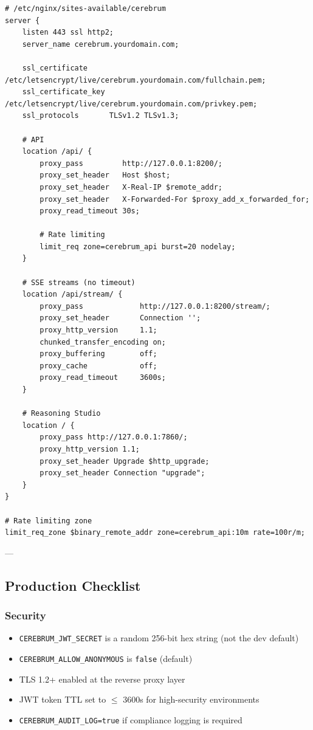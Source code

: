 \documentclass[11pt,article,oneside]{memoir}
\begin{document}
\begin{lstlisting}
# /etc/nginx/sites-available/cerebrum
server {
    listen 443 ssl http2;
    server_name cerebrum.yourdomain.com;

    ssl_certificate     /etc/letsencrypt/live/cerebrum.yourdomain.com/fullchain.pem;
    ssl_certificate_key /etc/letsencrypt/live/cerebrum.yourdomain.com/privkey.pem;
    ssl_protocols       TLSv1.2 TLSv1.3;

    # API
    location /api/ {
        proxy_pass         http://127.0.0.1:8200/;
        proxy_set_header   Host $host;
        proxy_set_header   X-Real-IP $remote_addr;
        proxy_set_header   X-Forwarded-For $proxy_add_x_forwarded_for;
        proxy_read_timeout 30s;

        # Rate limiting
        limit_req zone=cerebrum_api burst=20 nodelay;
    }

    # SSE streams (no timeout)
    location /api/stream/ {
        proxy_pass             http://127.0.0.1:8200/stream/;
        proxy_set_header       Connection '';
        proxy_http_version     1.1;
        chunked_transfer_encoding on;
        proxy_buffering        off;
        proxy_cache            off;
        proxy_read_timeout     3600s;
    }

    # Reasoning Studio
    location / {
        proxy_pass http://127.0.0.1:7860/;
        proxy_http_version 1.1;
        proxy_set_header Upgrade $http_upgrade;
        proxy_set_header Connection "upgrade";
    }
}

# Rate limiting zone
limit_req_zone $binary_remote_addr zone=cerebrum_api:10m rate=100r/m;
\end{lstlisting}

---

\subsection{Production Checklist}

\subsubsection{Security}
\begin{itemize}
\item [ ] \texttt{CEREBRUM\_JWT\_SECRET} is a random 256-bit hex string (not the dev default)
\item [ ] \texttt{CEREBRUM\_ALLOW\_ANONYMOUS} is \texttt{false} (default)
\item [ ] TLS 1.2+ enabled at the reverse proxy layer
\item [ ] JWT token TTL set to $\le$ 3600s for high-security envir\-onments
\item [ ] \texttt{CEREBRUM\_AUDIT\_LOG=true} if compliance logging is required

\end{itemize}
\end{document}
